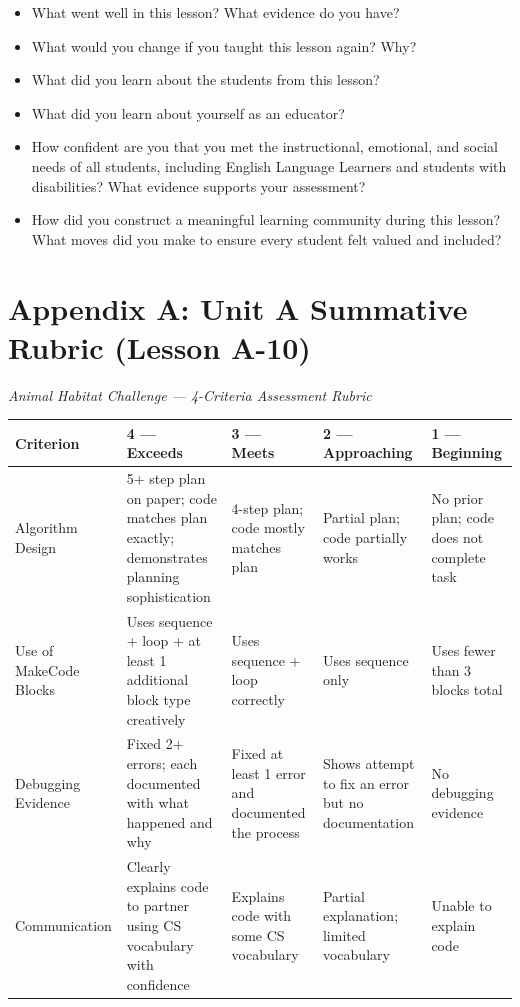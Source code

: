 \documentclass[11pt,letterpaper]{article}
\begin{document}
\begin{itemize}
  \item What went well in this lesson? What evidence do you have?

  \item What would you change if you taught this lesson again? Why?

  \item What did you learn about the students from this lesson?

  \item What did you learn about yourself as an educator?

  \item How confident are you that you met the instructional, emotional, and social needs of all students, including English Language Learners and students with disabilities? What evidence supports your assessment?

  \item How did you construct a meaningful learning community during this lesson? What moves did you make to ensure every student felt valued and included?
\end{itemize}

\newpage
\section{Appendix A: Unit A Summative Rubric (Lesson A-10)}
\label{sec:AppendixAUnitASummativeRubricLessonA10}

\textit{Animal Habitat Challenge --- 4-Criteria Assessment Rubric}

\begin{longtable}{|L{0.18\textwidth}|L{0.18\textwidth}|L{0.18\textwidth}|L{0.18\textwidth}|L{0.18\textwidth}|}
\hline
\textbf{Criterion}  & \textbf{4 --- Exceeds}  & \textbf{3 --- Meets}  & \textbf{2 --- Approaching}  & \textbf{1 --- Beginning}  \\
\hline
Algorithm Design  & 5+ step plan on paper; code matches plan exactly; demonstrates planning sophistication  & 4-step plan; code mostly matches plan  & Partial plan; code partially works  & No prior plan; code does not complete task  \\
\hline
Use of MakeCode Blocks  & Uses sequence + loop + at least 1 additional block type creatively  & Uses sequence + loop correctly  & Uses sequence only  & Uses fewer than 3 blocks total  \\
\hline
Debugging Evidence  & Fixed 2+ errors; each documented with what happened and why  & Fixed at least 1 error and documented the process  & Shows attempt to fix an error but no documentation  & No debugging evidence  \\
\hline
Communication  & Clearly explains code to partner using CS vocabulary with confidence  & Explains code with some CS vocabulary  & Partial explanation; limited vocabulary  & Unable to explain code  \\
\hline
\end{longtable}
\end{document}
